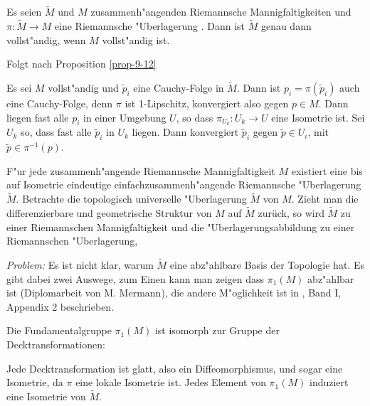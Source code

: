 \begin{Prop}
Es seien $\tilde M$ und $M$ zusammenh"angenden Riemannsche Mannigfaltigkeiten und $\pi: \tilde M \to M$ eine Riemannsche "Uberlagerung . Dann ist $\tilde M$ genau dann vollst"andig, wenn $M$ vollst"andig ist.
\end{Prop}

\begin{bew}\begin{description}[font=\normalfont]
\item[\quot{$\Rightarrow$}:]
	Folgt nach Proposition \ref{prop-9-12}
\item[\quot{$\Leftarrow$}:]
	Es sei $M$ vollst"andig und $\tilde p_i$ eine Cauchy-Folge in $\tilde M$.
	Dann ist $p_i = \pi(\tilde p_i)$ auch eine Cauchy-Folge, denn $\pi$ ist 1-Lipschitz, konvergiert also gegen $p \in M$.
	Dann liegen fast alle $p_i$ in einer Umgebung $U$, so dass $\pi_{U_k}: U_k \to U$ eine Isometrie ist.
	Sei $U_k$ so, dass fast alle $\tilde p_i$ in $U_k$ liegen.
	Dann konvergiert $\tilde p_i$ gegen $\tilde p \in U_i$, mit $\tilde p \in \pi^{-1}(p)$.
\end{description}\end{bew}

F"ur jede zusammenh"angende Riemannsche Mannigfaltigkeit $M$ existiert eine bis auf Isometrie eindeutige einfachzusammenh"angende Riemannsche "Uberlagerung $\tilde M$.
Betrachte die topologisch universelle "Uberlagerung $\tilde M$ von $M$.
Zieht man die differenzierbare und geometrische Struktur von $M$ auf $\tilde M$ zurück, so wird $\tilde M$ zu einer Riemannschen Mannigfaltigkeit und die "Uberlagerungsabbildung zu einer Riemannschen "Uberlagerung,

\emph{Problem:} Es ist nicht klar, warum $\tilde M$ eine abz"ahlbare Basis der Topologie hat.
Es gibt dabei zwei Auswege, zum Einen kann man zeigen dass $\pi_1(M)$ abz"ahlbar ist (Diplomarbeit von M. Mermann), die andere M"oglichkeit ist in , Band I, Appendix 2 \cite{kobayashi-nomizu1963foundations-diffgeo} beschrieben.

Die Fundamentalgruppe $\pi_1(M)$ ist isomorph zur Gruppe der Decktransformationen:
\begin{center}\end{center}
Jede Decktransformation ist glatt, also ein Diffeomorphismus, und sogar eine Isometrie, da $\pi$ eine lokale Isometrie ist. Jedes Element von $\pi_1(M)$ induziert eine Isometrie von $\tilde M$.

